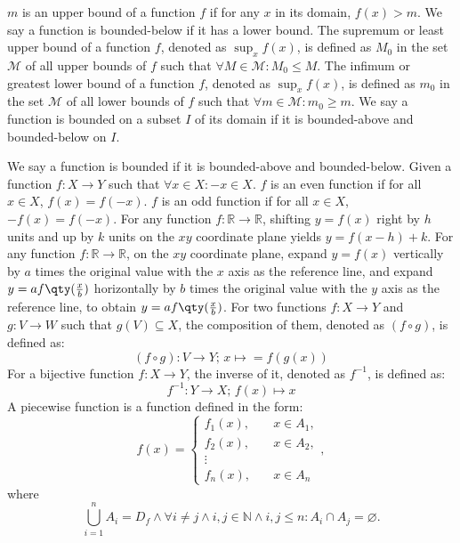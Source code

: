 \documentclass[a4paper,12pt]{report}
\begin{document}
$m$ is an upper bound of a function $f$ if for any $x$ in its domain, $f(x)>m$. We say a function is bounded-below if it has a lower bound.
The supremum or least upper bound of a function $f$, denoted as $\sup_xf(x)$, is defined as $M_0$ in the set $\mathcal{M}$ of all upper bounds of $f$ such that $\forall M\in\mathcal{M}\colon M_0\leq M$.
The infimum or greatest lower bound of a function $f$, denoted as $\sup_xf(x)$, is defined as $m_0$ in the set $\mathcal{M}$ of all lower bounds of $f$ such that $\forall m\in\mathcal{M}\colon m_0\geq m$.
We say a function is bounded on a subset $I$ of its domain if it is bounded-above and bounded-below on $I$.

We say a function is bounded if it is bounded-above and bounded-below.
Given a function $f\colon X\to Y$ such that $\forall x\in X\colon -x\in X$.
$f$ is an even function if for all $x\in X$, $f(x)=f(-x)$.
$f$ is an odd function if for all $x\in X$, $-f(x)=f(-x)$.
For any function $f\colon\mathbb{R}\to\mathbb{R}$, shifting $y=f(x)$ right by $h$ units and up by $k$ units on the $xy$ coordinate plane yields $y=f(x-h)+k$.
For any function $f\colon\mathbb{R}\to\mathbb{R}$, on the $xy$ coordinate plane, expand $y=f(x)$ vertically by $a$ times the original value with the $x$ axis as the reference line, and expand $y=af\qty(\frac{x}{b})$ horizontally by $b$ times the original value with the $y$ axis as the reference line, to obtain $y=af\qty(\frac{x}{b})$.
For two functions $f\colon X\to Y$ and $g\colon V\to W$ such that $g(V)\subseteq X$, the composition of them, denoted as $(f\circ g)$, is defined as:
\[(f \circ g)\colon V\to Y;\,x\mapsto = f(g(x))\]
For a bijective function $f\colon X\to Y$, the inverse of it, denoted as $f^{-1}$, is defined as:
\[f^{-1}\colon Y\to X;\,f(x)\mapsto x\]
A piecewise function is a function defined in the form:
\[f(x) =
\begin{cases}
f_1(x), & \quad x\in A_1, \\
f_2(x), & \quad x\in A_2, \\
\vdots \\
f_n(x), & \quad x \in A_n
\end{cases},\]
where
\[\bigcup_{i=1}^nA_i=D_f\land\forall i\neq j\land i,j\in\mathbb{N}\land i,j\leq n\colon A_i\cap A_j=\varnothing.\]
\end{document}

